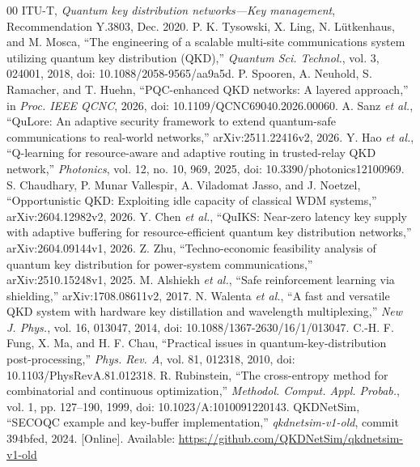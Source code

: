 \documentclass[conference,a4paper]{IEEEtran}
\begin{document}
\begin{thebibliography}{00}
 ITU-T, \emph{Quantum key distribution networks---Key management}, Recommendation Y.3803, Dec. 2020.
 P. K. Tysowski, X. Ling, N. L\"utkenhaus, and M. Mosca, ``The engineering of a scalable multi-site communications system utilizing quantum key distribution (QKD),'' \emph{Quantum Sci. Technol.}, vol. 3, 024001, 2018, doi: 10.1088/2058-9565/aa9a5d.
 P. Spooren, A. Neuhold, S. Ramacher, and T. Huehn, ``PQC-enhanced QKD networks: A layered approach,'' in \emph{Proc. IEEE QCNC}, 2026, doi: 10.1109/QCNC69040.2026.00060.
 A. Sanz \emph{et al.}, ``QuLore: An adaptive security framework to extend quantum-safe communications to real-world networks,'' arXiv:2511.22416v2, 2026.
 Y. Hao \emph{et al.}, ``Q-learning for resource-aware and adaptive routing in trusted-relay QKD network,'' \emph{Photonics}, vol. 12, no. 10, 969, 2025, doi: 10.3390/photonics12100969.
 S. Chaudhary, P. Munar Vallespir, A. Viladomat Jasso, and J. Noetzel, ``Opportunistic QKD: Exploiting idle capacity of classical WDM systems,'' arXiv:2604.12982v2, 2026.
 Y. Chen \emph{et al.}, ``QuIKS: Near-zero latency key supply with adaptive buffering for resource-efficient quantum key distribution networks,'' arXiv:2604.09144v1, 2026.
 Z. Zhu, ``Techno-economic feasibility analysis of quantum key distribution for power-system communications,'' arXiv:2510.15248v1, 2025.
 M. Alshiekh \emph{et al.}, ``Safe reinforcement learning via shielding,'' arXiv:1708.08611v2, 2017.
 N. Walenta \emph{et al.}, ``A fast and versatile QKD system with hardware key distillation and wavelength multiplexing,'' \emph{New J. Phys.}, vol. 16, 013047, 2014, doi: 10.1088/1367-2630/16/1/013047.
 C.-H. F. Fung, X. Ma, and H. F. Chau, ``Practical issues in quantum-key-distribution post-processing,'' \emph{Phys. Rev. A}, vol. 81, 012318, 2010, doi: 10.1103/PhysRevA.81.012318.
 R. Rubinstein, ``The cross-entropy method for combinatorial and continuous optimization,'' \emph{Methodol. Comput. Appl. Probab.}, vol. 1, pp. 127--190, 1999, doi: 10.1023/A:1010091220143.
 QKDNetSim, ``SECOQC example and key-buffer implementation,'' \emph{qkdnetsim-v1-old}, commit 394bfed, 2024. [Online]. Available: \url{https://github.com/QKDNetSim/qkdnetsim-v1-old}
\end{thebibliography}
\end{document}
